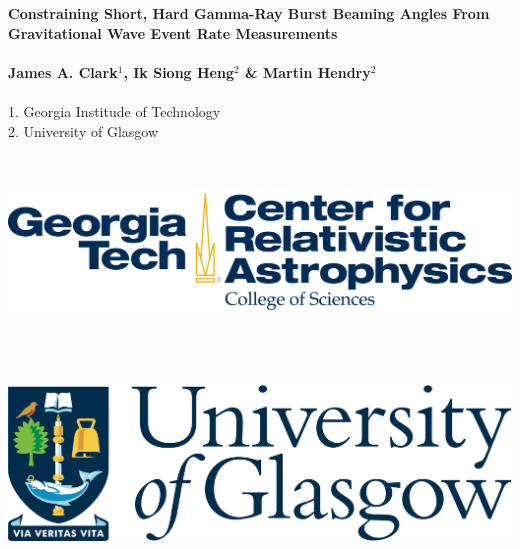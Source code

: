 \documentclass[a0,landscape]{a0poster}
\begin{document}


\begin{minipage}[b]{0.7\linewidth}
\veryHuge \color{NavyBlue} \textbf{Constraining Short, Hard Gamma-Ray Burst Beaming Angles From
Gravitational Wave Event Rate Measurements} \color{Black}\\ \\%
\huge \textbf{James A. Clark$^{1}$, Ik Siong Heng$^{2}$ \& Martin
Hendry$^{2}$}\\ \\%
\large 1. Georgia Institude of Technology\\ %
\large 2. University of Glasgow\\ %
\end{minipage}
%
\hspace{10cm}
%
\begin{minipage}[b]{0.2\linewidth}
\includegraphics[height=5cm]{cra.png} \\ \\%
\includegraphics[height=5cm]{uni_glasgow_logo.png} \\ \\%
\end{minipage}
\end{document}
